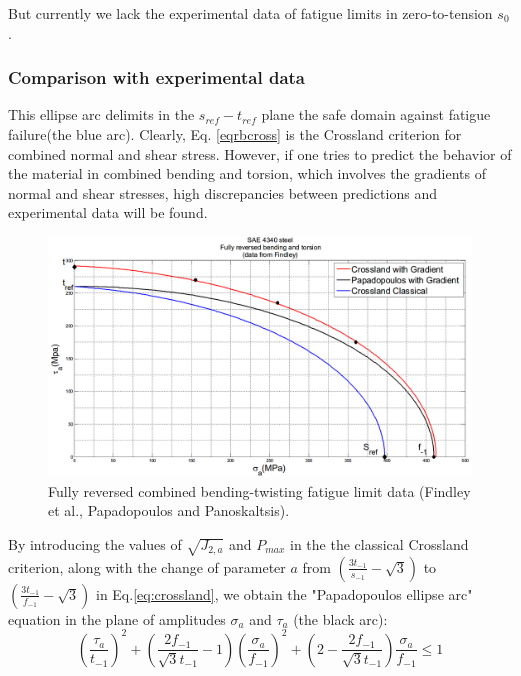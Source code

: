 \documentclass[3p,times,procedia,number]{elsarticle}
\begin{document}
\noindent
But currently we lack the experimental data of fatigue limits in zero-to-tension $s_0$.

\subsubsection{Comparison with experimental data}
This ellipse arc delimits in the $s_{ref}-t_{ref}$  plane the safe domain against fatigue failure(the blue arc). Clearly,
Eq. \eqref{eqrbcross} is the Crossland criterion for combined normal and shear stress. However, if one tries	to predict the behavior of the material in combined bending and torsion, which involves  the gradients of normal and	shear stresses, high discrepancies between predictions and experimental data will be found. 

\begin{figure}[h!]
	\includegraphics[width=\textwidth]{figures//4340.png}
	\caption{Fully reversed combined bending-twisting fatigue limit data (Findley et al.\cite{findley1956theory}, Papadopoulos and Panoskaltsis\cite{papadopoulos1996invariant}).}
	\label{4340}
\end{figure}


By introducing the values of $\sqrt{J_{2,a}}$ and $P_{max}$ in the the classical Crossland criterion, along with the change of parameter $a$  from $\left(\frac{3 t_{-1}}{s_{-1}}-\sqrt{3}\right)$ to $\left(\frac{3 t_{-1}}{f_{-1}}-\sqrt{3}\right)$ in Eq.\eqref{eq:crossland}, we obtain the "Papadopoulos ellipse arc" equation in the plane of amplitudes $\sigma_a$ and $\tau_a$ (the black arc):
\begin{equation}
(\frac{\tau_a}{t_{-1}})^2+(\frac{2f_{-1}}{\sqrt{3}t_{-1}}-1)(\frac{\sigma_a}{f_{-1}})^2+(2-\frac{2f_{-1}}{\sqrt{3}t_{-1}})\frac{\sigma_a}{f_{-1}}\leqslant 1
\label{papa}
\end{equation}
\end{document}
